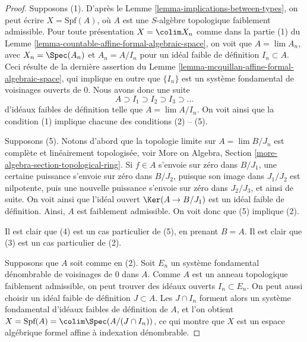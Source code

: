 \begin{proof}
Supposons (1). D'après le Lemme \ref{lemma-implications-between-types},
on peut écrire $X = \text{Spf}(A)$, où $A$ est une $S$-algèbre topologique
faiblement admissible. Pour toute présentation $X = \colim X_n$ comme dans la
partie (1) du Lemme \ref{lemma-countable-affine-formal-algebraic-space},
on voit que $A = \lim A_n$, avec $X_n = \Spec(A_n)$ et
$A_n = A/I_n$ pour un idéal faible de définition $I_n \subset A$.
Ceci résulte de la dernière assertion du
Lemme \ref{lemma-mcquillan-affine-formal-algebraic-space},
qui implique en outre que $\{I_n\}$ est un système fondamental
de voisinages ouverts de $0$. Nous avons donc une suite
$$
A \supset I_1 \supset I_2 \supset I_3 \supset \ldots
$$
d'idéaux faibles de définition telle que $A = \lim A/I_n$. On voit ainsi
que la condition (1) implique chacune des conditions (2) -- (5).

\medskip\noindent
Supposons (5). Notons d'abord que la topologie limite sur
$A = \lim B/J_n$ est complète et linéairement topologisée, voir
More on Algebra, Section \ref{more-algebra-section-topological-ring}.
Si $f \in A$ s'envoie sur zéro dans $B/J_1$, une certaine puissance s'envoie sur zéro
dans $B/J_2$, puisque son image dans $J_1/J_2$ est nilpotente, puis une nouvelle
puissance s'envoie sur zéro dans $J_2/J_3$, et ainsi de suite. On voit ainsi que
l'idéal ouvert $\Ker(A \to B/J_1)$ est un idéal faible de définition.
Ainsi, $A$ est faiblement admissible. On voit donc que (5) implique (2).

\medskip\noindent
Il est clair que (4) est un cas particulier de (5), en prenant $B = A$.
Il est clair que (3) est un cas particulier de (2).

\medskip\noindent
Supposons que $A$ soit comme en (2). Soit $E_n$ un système fondamental dénombrable
de voisinages de $0$ dans $A$. Comme $A$ est un anneau topologique faiblement
admissible, on peut trouver des idéaux ouverts $I_n \subset E_n$.
On peut aussi choisir un idéal faible de définition $J \subset A$.
Les $J \cap I_n$ forment alors un système fondamental d'idéaux faibles de définition
de $A$, et l'on obtient
$X = \text{Spf}(A) = \colim \Spec(A/(J \cap I_n))$,
ce qui montre que $X$ est un espace algébrique formel affine à indexation dénombrable.
\end{proof}


